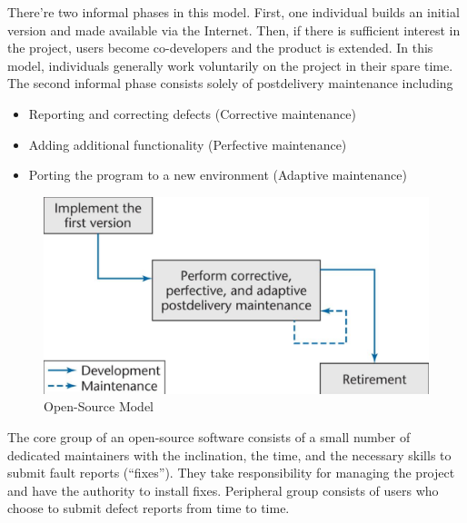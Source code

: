 \documentclass[11pt]{article}
\begin{document}
There're two informal phases in this model. First, one individual builds an initial version and made available via the Internet. Then, if there is sufficient interest in the project, users become co-developers and the product is extended. In this model, individuals generally work voluntarily on the project in their spare time. 
The second informal phase consists solely of postdelivery maintenance including

\begin{itemize}
	\item Reporting and correcting defects (Corrective maintenance)
	\item Adding additional functionality (Perfective maintenance)
	\item Porting the program to a new environment (Adaptive maintenance)
\end{itemize}

\begin{figure}[h]
	\centering
	\includegraphics[width=0.6\linewidth]{images/OpenSource.png}
	\caption{Open-Source Model }
	\label{fig:OpenSource}
\end{figure}

The core group of an open-source software consists of a small number of dedicated maintainers with the inclination, the time, and the necessary skills to submit fault reports (“fixes”). They take responsibility for managing the project and have the authority to install fixes. Peripheral group consists of users who choose to submit defect reports from time to time.
\end{document}
